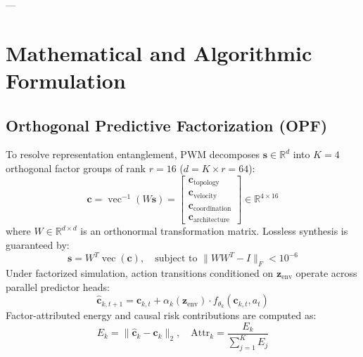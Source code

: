 \documentclass[11pt,a4paper]{article}
\begin{document}
---

\section{Mathematical and Algorithmic Formulation}

\subsection{Orthogonal Predictive Factorization (OPF)}
To resolve representation entanglement, PWM decomposes $\mathbf{s} \in \mathbb{R}^d$ into $K=4$ orthogonal factor groups of rank $r=16$ ($d = K \times r = 64$):
\begin{equation}
    \mathbf{c} = \operatorname{vec}^{-1}(W \mathbf{s}) = \begin{bmatrix}
        \mathbf{c}_{\text{topology}} \\
        \mathbf{c}_{\text{velocity}} \\
        \mathbf{c}_{\text{coordination}} \\
        \mathbf{c}_{\text{architecture}}
    \end{bmatrix} \in \mathbb{R}^{4 \times 16}
\end{equation}
where $W \in \mathbb{R}^{d \times d}$ is an orthonormal transformation matrix. Lossless synthesis is guaranteed by:
\begin{equation}
    \mathbf{s} = W^T \operatorname{vec}(\mathbf{c}), \quad \text{subject to } \|W W^T - I\|_F < 10^{-6}
\end{equation}
Under factorized simulation, action transitions conditioned on $\mathbf{z}_{\text{env}}$ operate across parallel predictor heads:
\begin{equation}
    \hat{\mathbf{c}}_{k, t+1} = \mathbf{c}_{k, t} + \alpha_k(\mathbf{z}_{\text{env}}) \cdot f_{\theta_k}(\mathbf{c}_{k, t}, a_t)
\end{equation}
Factor-attributed energy and causal risk contributions are computed as:
\begin{equation}
    E_k = \|\hat{\mathbf{c}}_k - \mathbf{c}_k\|_2, \quad \text{Attr}_k = \frac{E_k}{\sum_{j=1}^K E_j}
\end{equation}
\end{document}

